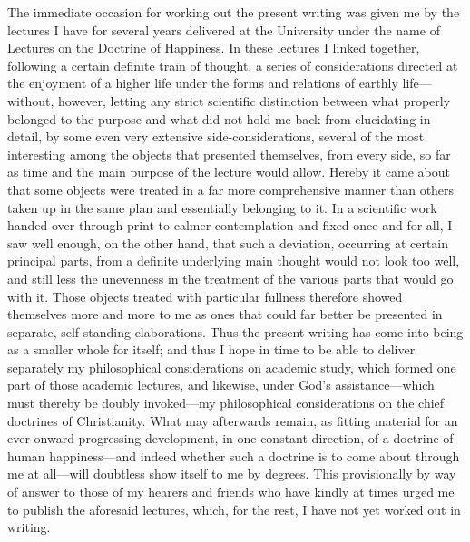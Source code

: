 \documentclass[12pt,a4paper]{book}
\begin{document}
The immediate occasion for working out the present writing was given me
by the lectures I have for several years delivered at the University
under the name of Lectures on the Doctrine of Happiness. In these
lectures I linked together, following a certain definite train of
thought, a series of considerations directed at the enjoyment of a higher
life under the forms and relations of earthly life---without, however,
letting any strict scientific distinction between what properly belonged
to the purpose and what did not hold me back from elucidating in detail,
by some even very extensive side-considerations, several of the most
interesting among the objects that presented themselves, from every side,
so far as time and the main purpose of the lecture would allow. Hereby it
came about that some objects were treated in a far more comprehensive
manner than others taken up in the same plan and essentially belonging to
it. In a scientific work handed over through print to calmer
contemplation and fixed once and for all, I saw well enough, on the other
hand, that such a deviation, occurring at certain principal parts, from a
definite underlying main thought would not look too well, and still less
the unevenness in the treatment of the various parts that would go with
it. Those objects treated with particular fullness therefore showed
themselves more and more to me as ones that could far better be presented
in separate, self-standing elaborations. Thus the present writing has
come into being as a smaller whole for itself; and thus I hope in time to
be able to deliver separately my philosophical considerations on academic
study, which formed one part of those academic lectures, and likewise,
under God's assistance---which must thereby be doubly invoked---my
philosophical considerations on the chief doctrines of Christianity. What
may afterwards remain, as fitting material for an ever onward-progressing
development, in one constant direction, of a doctrine of human
happiness---and indeed whether such a doctrine is to come about through me
at all---will doubtless show itself to me by degrees. This provisionally
by way of answer to those of my hearers and friends who have kindly at
times urged me to publish the aforesaid lectures, which, for the rest, I
have not yet worked out in writing.
\end{document}
